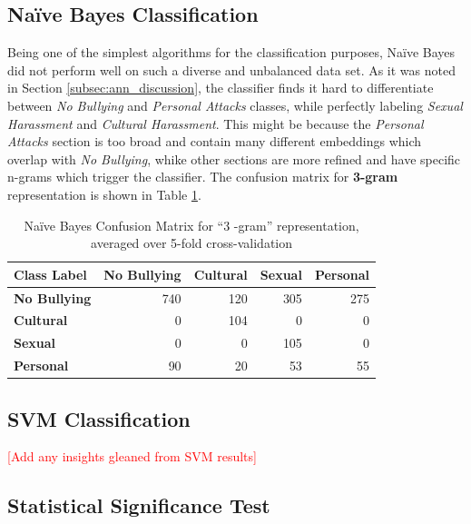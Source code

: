 \documentclass[conference]{sig-alternate-05-2015}
\newcommand{\todo}[1]{{\textcolor{red}{[#1]}}}
\begin{document}
\subsection{Na\"ive Bayes Classification}\label{subsec:bayes_discussion}
Being one of the simplest algorithms for the classification purposes, Na\"ive Bayes
did not perform well on such a diverse and unbalanced data set. As it was noted in
Section \ref{subsec:ann_discussion}, the classifier finds it hard to differentiate 
between \textit{No Bullying} and \textit{Personal Attacks} classes, while perfectly 
labeling \textit{Sexual Harassment} and \textit{Cultural Harassment}. This might be
because the \textit{Personal Attacks} section is too broad and contain many different
embeddings which overlap with \textit{No Bullying}, whike other sections are more refined
and have specific n-grams which trigger the classifier. The confusion matrix for \textbf{3-gram}
representation is shown in Table \ref{tab:bayes_confusion_matrix}.

\begin{table}[ht!]
  \centering
  \begin{tabular}{| l | r | r | r | r |}
    \hline
    \textbf{Class Label} & \textbf{No Bullying} & \textbf{Cultural} & \textbf{Sexual} & \textbf{Personal} \\
    \hline\hline
    \textbf{No Bullying} & 740 & 120 & 305 & 275 \\
    \textbf{Cultural} & 0 & 104 & 0 & 0 \\
    \textbf{Sexual} & 0 & 0 & 105 & 0 \\
    \textbf{Personal} & 90 & 20 & 53 & 55 \\
    \hline
  \end{tabular}
  \caption{Na\"ive Bayes Confusion Matrix for ``3 -gram'' representation,
  averaged over 5-fold cross-validation}
  \label{tab:bayes_confusion_matrix}
\end{table}


\subsection{SVM Classification}\label{subsec:svm_discussion}

\todo{Add any insights gleaned from SVM results}

\subsection{Statistical Significance Test}\label{subsec:stat_sig_discussion}
\end{document}
